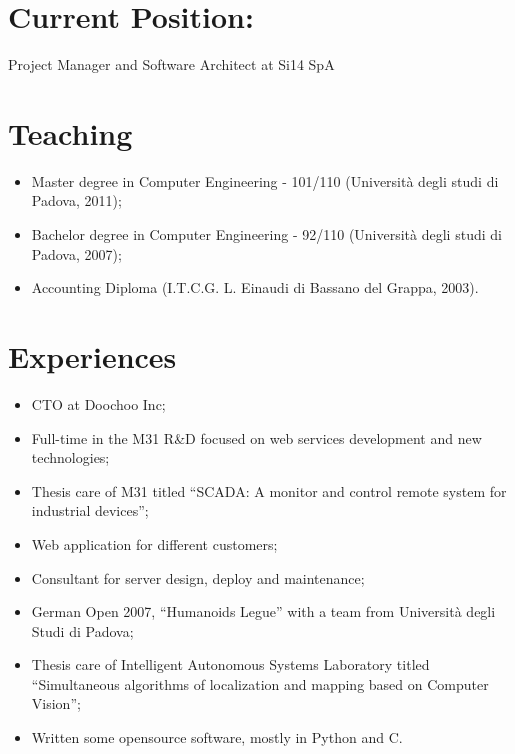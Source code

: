 \documentclass[pdftex, a4paper, 11pt]{article}
\begin{document}
\section*{Current Position:}

Project Manager and Software Architect at Si14 SpA


\section*{Teaching}
\begin{itemize}
\item Master degree in Computer Engineering - 101/110 (Universit\`a degli studi di Padova, 2011);
\item Bachelor degree in Computer Engineering - 92/110 (Universit\`a degli studi di Padova, 2007);
\item Accounting Diploma (I.T.C.G. L. Einaudi di Bassano del Grappa, 2003).
\end{itemize}

\section*{Experiences}
\begin{itemize}
\item CTO at Doochoo Inc;
\item Full-time in the M31 R\&D focused on web services development and new technologies;
\item Thesis care of M31 titled ``SCADA: A monitor and control remote system for industrial devices'';
\item Web application for different customers;
\item Consultant for server design, deploy and maintenance;
\item German Open 2007, ``Humanoids Legue'' with a team from Universit\`a
degli Studi di Padova;
\item Thesis care of Intelligent Autonomous Systems Laboratory titled ``Simultaneous
algorithms of localization and mapping based on Computer Vision'';
\item Written some opensource software, mostly in Python and C.
\end{itemize}
\end{document}

